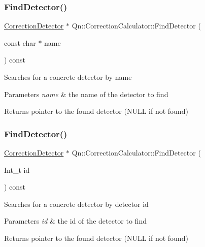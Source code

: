 \subsubsection{\texorpdfstring{Find\+Detector()}{FindDetector()}\hspace{0.1cm}{\footnotesize\ttfamily [1/2]}}
{\footnotesize\ttfamily \mbox{\hyperlink{classQn_1_1CorrectionDetector}{Correction\+Detector}} $\ast$ Qn\+::\+Correction\+Calculator\+::\+Find\+Detector (\begin{DoxyParamCaption}\item[{const char $\ast$}]{name }\end{DoxyParamCaption}) const}

Searches for a concrete detector by name 
\begin{DoxyParams}{Parameters}
{\em name} & the name of the detector to find \\
\hline
\end{DoxyParams}
\begin{DoxyReturn}{Returns}
pointer to the found detector (N\+U\+LL if not found) 
\end{DoxyReturn}
\mbox{\label{classQn_1_1CorrectionCalculator_affd2bd5b4eb73289f03356c3246dfeb3}} 
\subsubsection{\texorpdfstring{Find\+Detector()}{FindDetector()}\hspace{0.1cm}{\footnotesize\ttfamily [2/2]}}
{\footnotesize\ttfamily \mbox{\hyperlink{classQn_1_1CorrectionDetector}{Correction\+Detector}} $\ast$ Qn\+::\+Correction\+Calculator\+::\+Find\+Detector (\begin{DoxyParamCaption}\item[{Int\+\_\+t}]{id }\end{DoxyParamCaption}) const}

Searches for a concrete detector by detector id 
\begin{DoxyParams}{Parameters}
{\em id} & the id of the detector to find \\
\hline
\end{DoxyParams}
\begin{DoxyReturn}{Returns}
pointer to the found detector (N\+U\+LL if not found) 
\end{DoxyReturn}
\mbox{\label{classQn_1_1CorrectionCalculator_a0bc04e4ee0d401f3336cce67089cfbd7}} 
